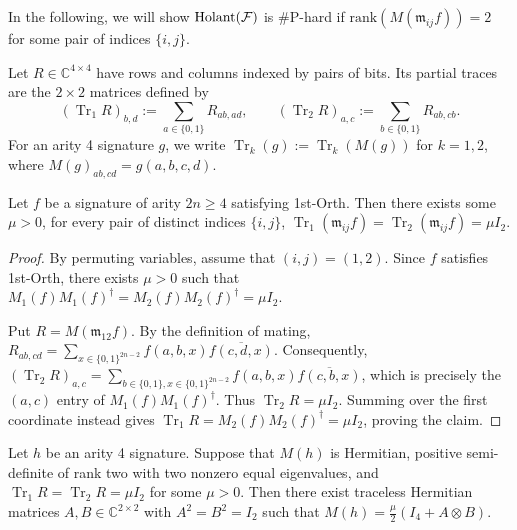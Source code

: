 In the following, we will show $\operatorname{Holant}(\mathcal{F})$ is \#P-hard if $\mathrm{rank}(M(\mathfrak{m}_{ij}f))=2$ for some pair of indices $\{i,j\}.$

\begin{definition}
Let $R\in\mathbb C^{4\times4}$ have rows and columns indexed
by pairs of bits. 
Its partial traces are the $2\times2$ matrices
defined by
\[
  (\operatorname{Tr}_1R)_{b,d}
  :=\sum_{a\in\{0,1\}}R_{ab,ad},
  \qquad
  (\operatorname{Tr}_2R)_{a,c}
  :=\sum_{b\in\{0,1\}}R_{ab,cb}.
\]
For an arity 4 signature $g$, we write
$\operatorname{Tr}_k(g):=\operatorname{Tr}_k(M(g))$ for $k=1,2$,
where $M(g)_{ab,cd}=g(a,b,c,d)$.
\end{definition}

\begin{lemma}\label{lem:mating-partial-traces}
Let $f$ be a signature of arity $2n\ge 4$ satisfying {\sc 1st-Orth}.
Then there exists some $\mu>0$, for every pair of distinct indices $\{i,j\}$,
\(
  \operatorname{Tr}_1(\mathfrak m_{ij}f)
  =\operatorname{Tr}_2(\mathfrak m_{ij}f)
  =\mu I_2.
\)
\end{lemma}

\begin{proof}
By permuting variables, assume that $(i,j)=(1,2)$.
Since $f$ satisfies {\sc 1st-Orth}, there exists $\mu>0$ such that
$M_1(f)M_1(f)^\dagger=M_2(f)M_2(f)^\dagger=\mu I_2$.

Put $R=M(\mathfrak m_{12}f)$. By the definition of mating,
$R_{ab,cd}=\sum_{x\in\{0,1\}^{2n-2}}
f(a,b,x)\overline{f(c,d,x)}$.
Consequently, $(\operatorname{Tr}_2R)_{a,c}=\sum_{b\in\{0,1\},x\in\{0,1\}^{2n-2}}
f(a,b,x)\overline{f(c,b,x)}$,
which is precisely the $(a,c)$ entry of $M_1(f)M_1(f)^\dagger$.
Thus $\operatorname{Tr}_2R=\mu I_2$.
Summing over the first coordinate instead gives
$\operatorname{Tr}_1R=M_2(f)M_2(f)^\dagger=\mu I_2$,
proving the claim.
\end{proof}

\begin{lemma}\label{lm:rank-two-matrix-form}
Let $h$ be an arity 4 signature.
Suppose that $M(h)$ is Hermitian, positive semi-definite of rank two with two nonzero equal eigenvalues, and
$\operatorname{Tr}_1R=\operatorname{Tr}_2R=\mu I_2$
for some $\mu>0$.
Then there exist traceless Hermitian matrices
$A,B\in\mathbb C^{2\times2}$ with $A^2=B^2=I_2$ such that
\(
  M(h)=\frac{\mu}{2}(I_4+A\otimes B).
\)
\end{lemma}

